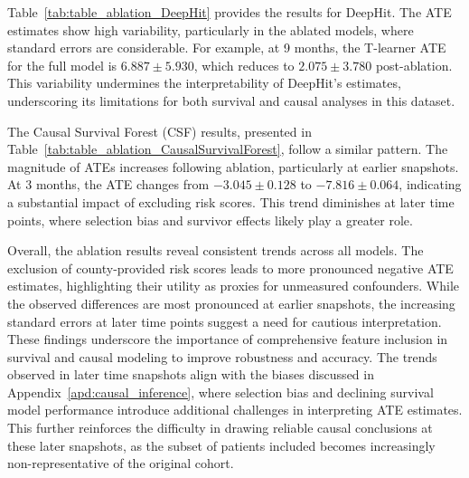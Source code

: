 Table~\ref{tab:table_ablation_DeepHit} provides the results for DeepHit.
The ATE estimates show high variability, particularly in the ablated models, where standard errors are considerable.
For example, at 9 months, the T-learner ATE for the full model is \(6.887 \pm 5.930\), which reduces to \(2.075 \pm 3.780\) post-ablation.
This variability undermines the interpretability of DeepHit's estimates, underscoring its limitations for both survival and causal analyses in this dataset.

The Causal Survival Forest (CSF) results, presented in Table~\ref{tab:table_ablation_CausalSurvivalForest}, follow a similar pattern.
The magnitude of ATEs increases following ablation, particularly at earlier snapshots.
At 3 months, the ATE changes from \(-3.045 \pm 0.128\) to \(-7.816 \pm 0.064\), indicating a substantial impact of excluding risk scores.
This trend diminishes at later time points, where selection bias and survivor effects likely play a greater role.

Overall, the ablation results reveal consistent trends across all models.
The exclusion of county-provided risk scores leads to more pronounced negative ATE estimates, highlighting their utility as proxies for unmeasured confounders.
While the observed differences are most pronounced at earlier snapshots, the increasing standard errors at later time points suggest a need for cautious interpretation.
These findings underscore the importance of comprehensive feature inclusion in survival and causal modeling to improve robustness and accuracy.
The trends observed in later time snapshots align with the biases discussed in Appendix~\ref{apd:causal_inference}, where selection bias and declining survival model performance introduce additional challenges in interpreting ATE estimates.
This further reinforces the difficulty in drawing reliable causal conclusions at these later snapshots, as the subset of patients included becomes increasingly non-representative of the original cohort.


